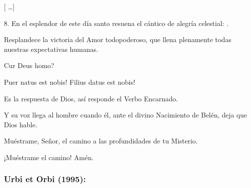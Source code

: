 \begin{body}
					{[} \ldots{}{]}
					
					8. En el esplendor de este día santo resuena el cántico de alegría celestial: .
					
					Resplandece la victoria del Amor todopoderoso, que llena plenamente todas nuestras expectativas humanas.
					
					Cur Deus homo?
					
					Puer natus est nobis! Filius datus est nobis!
					
					Es la respuesta de Dios, así responde el Verbo Encarnado.
					
					Y su voz llega al hombre cuando él, ante el divino Nacimiento de Belén, deja que Dios hable.
					
					Muéstrame, Señor, el camino a las profundidades de tu Misterio.
										
					¡Muéstrame el camino! Amén.
				\end{body}

			\subsubsection{Urbi et Orbi (1995):}

